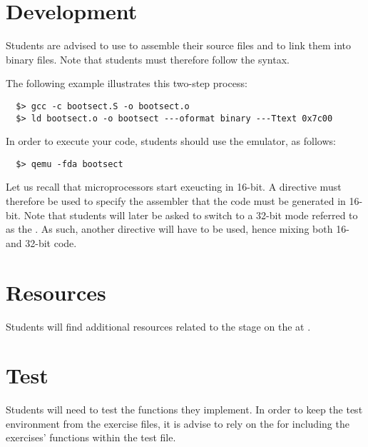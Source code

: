 %
%

\section{Development}

Students are advised to use  to assemble
their source files and  to link them into binary files. Note
that students must therefore follow the  syntax.

The following example illustrates this two-step process:

\begin{verbatim}
  $> gcc -c bootsect.S -o bootsect.o
  $> ld bootsect.o -o bootsect ---oformat binary ---Ttext 0x7c00
\end{verbatim}

In order to execute your code, students should use the  emulator,
as follows:

\begin{verbatim}
  $> qemu -fda bootsect
\end{verbatim}

Let us recall that  microprocessors start exeucting in 16-bit. A
directive must therefore be used to specify the assembler that the code
must be generated in 16-bit. Note that students will later be asked to
switch to a 32-bit mode referred to as the . As such,
another directive will have to be used, hence mixing both 16- and 32-bit
code.

%
%

\section{Resources}

Students will find additional resources related to the  stage
on the  at .

%
%

\section{Test}

Students will need to test the functions they implement. In order to keep
the test environment from the exercise files, it is advise to rely on
the  for including the exercises' functions
within the test file.

